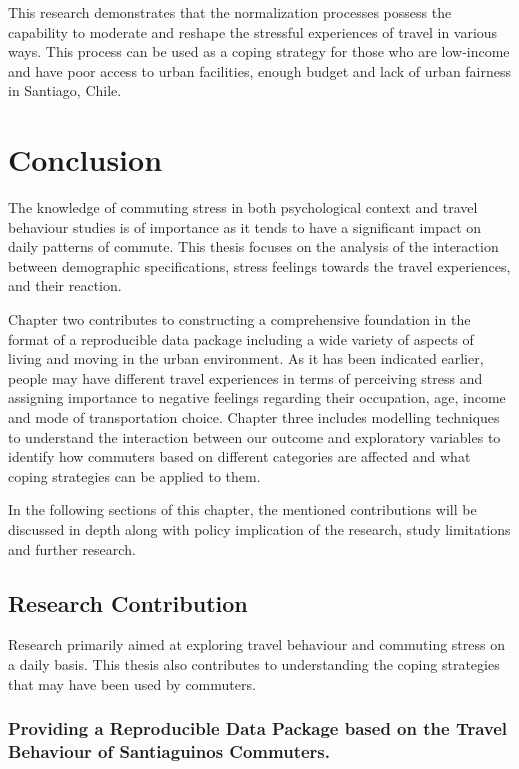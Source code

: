 \documentclass[
11pt, %
oneside, %
english, %
singlespacing, %
]{macthesis} %
\begin{document}
This research demonstrates that the normalization processes possess the capability to moderate and reshape the stressful experiences of travel in various ways. This process can be used as a coping strategy for those who are low-income and have poor access to urban facilities, enough budget and lack of urban fairness in Santiago, Chile.

\hypertarget{conclusion-1}{%
\chapter{Conclusion}\label{conclusion-1}}

The knowledge of commuting stress in both psychological context and travel behaviour studies is of importance as it tends to have a significant impact on daily patterns of commute. This thesis focuses on the analysis of the interaction between demographic specifications, stress feelings towards the travel experiences, and their reaction.

Chapter two contributes to constructing a comprehensive foundation in the format of a reproducible data package including a wide variety of aspects of living and moving in the urban environment. As it has been indicated earlier, people may have different travel experiences in terms of perceiving stress and assigning importance to negative feelings regarding their occupation, age, income and mode of transportation choice. Chapter three includes modelling techniques to understand the interaction between our outcome and exploratory variables to identify how commuters based on different categories are affected and what coping strategies can be applied to them.

In the following sections of this chapter, the mentioned contributions will be discussed in depth along with policy implication of the research, study limitations and further research.

\hypertarget{research-contribution}{%
\section{Research Contribution}\label{research-contribution}}

Research primarily aimed at exploring travel behaviour and commuting stress on a daily basis. This thesis also contributes to understanding the coping strategies that may have been used by commuters.

\hypertarget{providing-a-reproducible-data-package-based-on-the-travel-behaviour-of-santiaguinos-commuters.}{%
\subsection{Providing a Reproducible Data Package based on the Travel Behaviour of Santiaguinos Commuters.}\label{providing-a-reproducible-data-package-based-on-the-travel-behaviour-of-santiaguinos-commuters.}}
\end{document}
